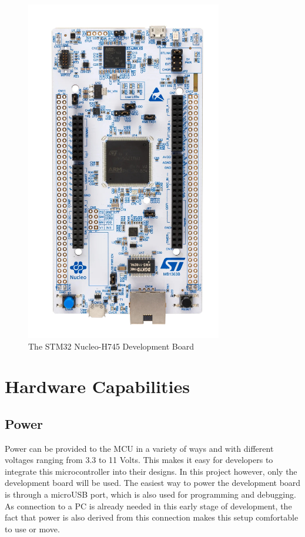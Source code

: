 \begin{figure}[!ht]
    \centering
    \includegraphics[height=150mm, keepaspectratio, angle=90]{figures/devboard.jpg}
    \caption{The STM32 Nucleo-H745 Development Board}
    \label{fig:Nucleo-H745}
\end{figure}

\section{Hardware Capabilities}

\subsection{Power}

Power can be provided to the MCU in a variety of ways and with different voltages ranging from 3.3 to 11 Volts. This makes it easy for developers to integrate this microcontroller into their designs. In this project however, only the development board will be used. The easiest way to power the development board is through a microUSB port, which is also used for programming and debugging. As connection to a PC is already needed in this early stage of development, the fact that power is also derived from this connection makes this setup comfortable to use or move.

